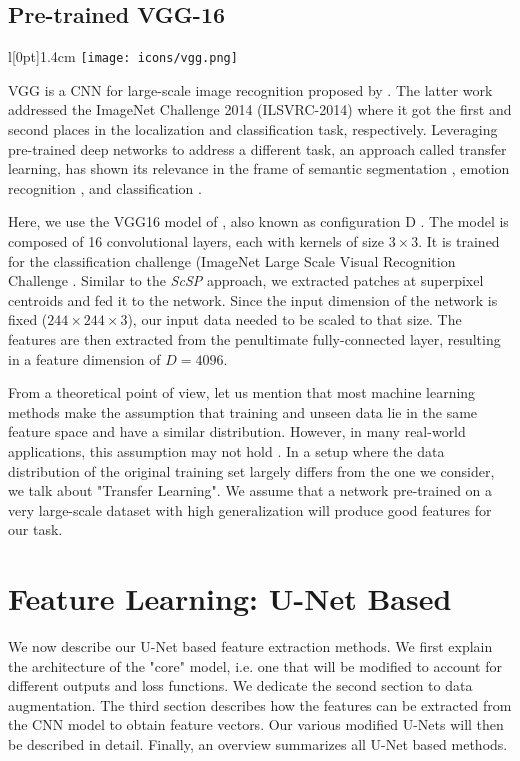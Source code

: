 \subsection{Pre-trained VGG-16} \label{vgg}
\begingroup
\setlength\intextsep{0pt}
\begin{wrapfigure}[4]{l}[0pt]{1.4cm}
\texttt{[image: icons/vgg.png]}
\end{wrapfigure}

VGG is a CNN for large-scale image recognition proposed by \cite{simonyan15}.
The latter work addressed the ImageNet \cite{ILSVRC15} Challenge 2014 (ILSVRC-2014) where it got the first and second places in the localization and classification task, respectively.
Leveraging pre-trained deep networks to address a different task, an approach called transfer learning, has shown its relevance in the frame of semantic segmentation \cite{long15}, emotion recognition \cite{ng15}, and classification \cite{huynh16}.

\endgroup

Here, we use the VGG16 model of \cite{simonyan16}, also known as configuration D \cite[Tab. 1]{simonyan15}.
The model is composed of 16 convolutional layers, each with kernels of size $3 \times 3$.
It is trained for the classification challenge (ImageNet Large Scale Visual Recognition Challenge \cite{ILSVRC15}.
Similar to the \textit{ScSP} approach, we extracted patches at superpixel centroids and fed it to the network.
Since the input dimension of the network is fixed ($244 \times 244 \times 3$), our input data needed to be scaled to that size.
The features are then extracted from the penultimate fully-connected layer, resulting in a feature dimension of $D=4096$.

From a theoretical point of view, let us mention that most machine learning methods make the assumption that training and unseen data lie in the same feature space and have a similar distribution.
However, in many real-world applications, this assumption may not hold \cite{pan2010}.
In a setup where the data distribution of the original training set largely differs from the one we consider, we talk about "Transfer Learning".
We assume that a network pre-trained on a very large-scale dataset with high generalization will produce good features for our task.

\section{Feature Learning: U-Net Based} \label{ch:unet_based}
We now describe our U-Net based feature extraction methods.
We first explain the architecture of the "core" model, i.e. one that will be modified to account for different outputs and loss functions.
We dedicate the second section to data augmentation.
The third section describes how the features can be extracted from the CNN model to obtain feature vectors.
Our various modified U-Nets will then be described in detail.
Finally, an overview summarizes all U-Net based methods.


